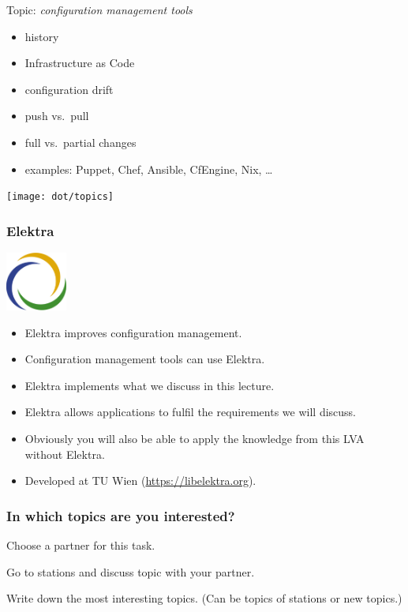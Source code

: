 \begin{frame}
	Topic: \textit{configuration management tools}
	\begin{itemize}
		\item history
		\item Infrastructure as Code
		\item configuration drift
		\item push vs.\ pull
		\item full vs.\ partial changes
		\item examples: Puppet, Chef, Ansible, CfEngine, Nix, \dots
	\end{itemize}
\end{frame}


\begin{frame}
	\hspace*{-1cm}\texttt{[image: dot/topics]}
\end{frame}

\begin{frame}
	\frametitle{Elektra}
	\hfill \includegraphics[width=2cm]{../figures/logo}
	\vspace{-1cm}
	\begin{itemize}
		\item Elektra improves configuration management.
		\item Configuration management tools can use Elektra.
		\item Elektra implements what we discuss in this lecture.
		\item Elektra allows applications to fulfil the requirements we will discuss.
		\item Obviously you will also be able to apply the knowledge from this LVA without Elektra.
		\item Developed at TU Wien (\url{https://libelektra.org}).
	\end{itemize}
\end{frame}

\begin{assignment}
	\frametitle{In which topics are you interested?}
	\begin{task}[1]
	Choose a partner for this task.
	\end{task}

	\begin{task}[2]
	Go to stations and discuss topic with your partner.
	\end{task}

	\begin{task}[3]
	Write down the most interesting topics.
	(Can be topics of stations or new topics.)
	\end{task}
\end{assignment}





